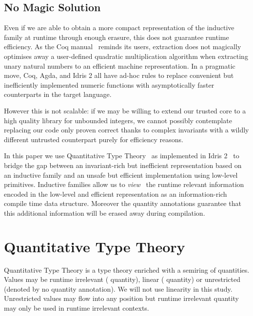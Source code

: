 \documentclass{article}
\newcommand{\idris}{Idris 2}
\newcommand{\coq}{Coq}
\newcommand{\agda}{Agda}
\begin{document}
\subsection{No Magic Solution}

Even if we are able to obtain a more compact representation of the inductive
family at runtime through enough erasure, this does not guarantee runtime efficiency.
As the \coq{} manual~\cite{Coq:manual} reminds its users, extraction does not magically
optimises away a user-defined quadratic multiplication algorithm when extracting unary
natural numbers to an efficient machine representation.
%
In a pragmatic move, \coq{}, \agda{}, and \idris{} all have ad-hoc rules to replace
convenient but inefficiently implemented numeric functions with asymptotically faster
counterparts in the target language.

However this is not scalable: if we may be willing to extend our trusted core to a
high quality library for unbounded integers, we cannot possibly contemplate replacing
our code only proven correct thanks to complex invariants with a wildly different
untrusted counterpart purely for efficiency reasons.

In this paper we use Quantitative Type
Theory~\cite{DBLP:conf/birthday/McBride16,DBLP:conf/lics/Atkey18}
as implemented in \idris{}~\cite{DBLP:conf/ecoop/Brady21} to bridge the gap between
an invariant-rich but inefficient representation based on an inductive family and
an unsafe but efficient implementation using low-level primitives.
%
Inductive families allow us to \emph{view}~\cite{DBLP:journals/jfp/McBrideM04} the
runtime relevant information encoded in the low-level and efficient representation
as an information-rich compile time data structure. Moreover the quantity annotations
guarantee that this additional information will be erased away during compilation.

\section{Quantitative Type Theory}

Quantitative Type Theory is a type theory enriched with a semiring of quantities.
Values may be runtime irrelevant ( quantity),
linear ( quantity) or unrestricted (denoted by no quantity annotation).
We will not use linearity in this study. Unrestricted values may flow into any position
but runtime irrelevant quantity may only be used in runtime irrelevant contexts.
\end{document}
